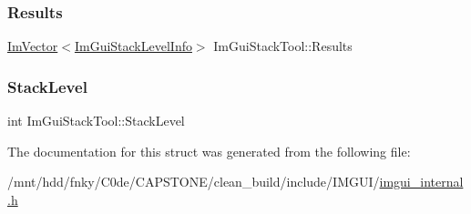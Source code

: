 \subsubsection{\texorpdfstring{Results}{Results}}
{\footnotesize\ttfamily \hyperlink{structImVector}{Im\+Vector}$<$\hyperlink{structImGuiStackLevelInfo}{Im\+Gui\+Stack\+Level\+Info}$>$ Im\+Gui\+Stack\+Tool\+::\+Results}

\mbox{\label{structImGuiStackTool_a5158be15394b997318c425451b42020e}} 
\subsubsection{\texorpdfstring{Stack\+Level}{StackLevel}}
{\footnotesize\ttfamily int Im\+Gui\+Stack\+Tool\+::\+Stack\+Level}



The documentation for this struct was generated from the following file\+:\begin{DoxyCompactItemize}
\item 
/mnt/hdd/fnky/\+C0de/\+C\+A\+P\+S\+T\+O\+N\+E/clean\+\_\+build/include/\+I\+M\+G\+U\+I/\hyperlink{imgui__internal_8h}{imgui\+\_\+internal.\+h}\end{DoxyCompactItemize}
